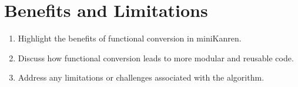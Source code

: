 \section{Benefits and Limitations}

\begin{enumerate}
    \item Highlight the benefits of functional conversion in miniKanren.
    \item Discuss how functional conversion leads to more modular and reusable code.
    \item Address any limitations or challenges associated with the algorithm.
\end{enumerate}